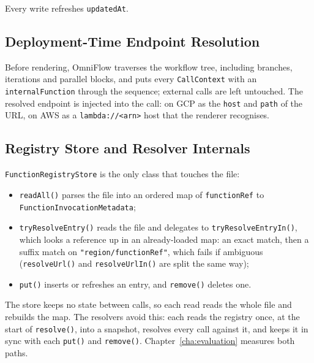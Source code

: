 Every write refreshes \texttt{updatedAt}.

\subsection{Deployment-Time Endpoint Resolution}
\label{subsec:endpoint-resolution}
Before rendering, OmniFlow traverses the workflow tree, including branches, iterations and parallel
blocks, and puts every \texttt{CallContext} with an \texttt{internalFunction} through the sequence;
external calls are left untouched. The resolved endpoint is injected into the call: on GCP as the
\texttt{host} and \texttt{path} of the URL, on AWS as a \texttt{lambda://<arn>} host that the
renderer recognises.

\subsection{Registry Store and Resolver Internals}
\label{subsec:store-internals}

\texttt{FunctionRegistryStore} is the only class that touches the file:
\begin{itemize}
  \item \texttt{readAll()} parses the file into an ordered map of \texttt{functionRef} to
  \texttt{Function\allowbreak Invocation\allowbreak Metadata};
  \item \texttt{tryResolveEntry()} reads the file and delegates to
  \texttt{tryResolveEntryIn()}, which looks a reference up in an already-loaded map: an exact match,
  then a suffix match on \texttt{"region/\allowbreak functionRef"}, which fails if ambiguous
  (\texttt{resolveUrl()} and \texttt{resolveUrlIn()} are split the same way);
  \item \texttt{put()} inserts or refreshes an entry, and \texttt{remove()} deletes one.
\end{itemize}
The store keeps no state between calls, so each read reads the whole file and rebuilds
the map. The resolvers avoid this: each reads the registry once, at the start of
\texttt{resolve()}, into a snapshot, resolves every call against it, and keeps it in sync with
each \texttt{put()} and \texttt{remove()}.
Chapter~\ref{cha:evaluation} measures both paths.

